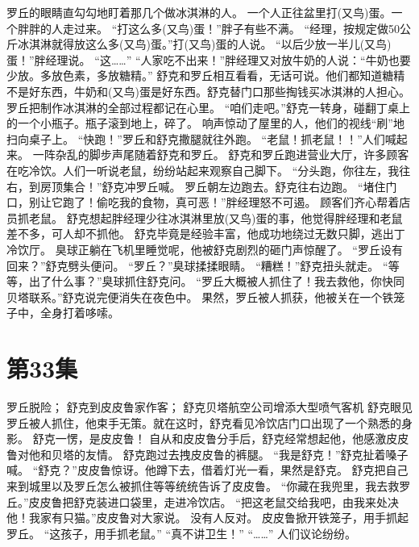 \documentclass[a4paper,12pt,UTF8,twoside]{ctexbook}
\begin{document}
        罗丘的眼睛直勾勾地盯着那几个做冰淇淋的人。 
        一个人正往盆里打(又鸟)蛋。一个胖胖的人走过来。 
        “打这么多(又鸟)蛋！”胖子有些不满。 
        “经理，按规定做50公斤冰淇淋就得放这么多(又鸟)蛋。”打(又鸟)蛋的人说。 
        “以后少放一半儿(又鸟)蛋！”胖经理说。 
        “这……” 
        “人家吃不出来！”胖经理又对放牛奶的人说：“牛奶也要少放。多放色素，多放糖精。” 
        舒克和罗丘相互看看，无话可说。他们都知道糖精不是好东西，牛奶和(又鸟)蛋是好东西。舒克替门口那些掏钱买冰淇淋的人担心。 
        罗丘把制作冰淇淋的全部过程都记在心里。 
        “咱们走吧。”舒克一转身，碰翻丁桌上的一个小瓶子。瓶子滚到地上，碎了。 
        响声惊动了屋里的人，他们的视线“刷”地扫向桌子上。 
        “快跑！”罗丘和舒克撒腿就往外跑。 
        “老鼠！抓老鼠！！”人们喊起来。 
        一阵杂乱的脚步声尾随着舒克和罗丘。 
        舒克和罗丘跑进营业大厅，许多顾客在吃冷饮。人们一听说老鼠，纷纷站起来观察自己脚下。 
        “分头跑，你往左，我往右，到房顶集合！”舒克冲罗丘喊。 
        罗丘朝左边跑去。舒克往右边跑。 
        “堵住门口，别让它跑了！偷吃我的食物，真可恶！”胖经理怒不可遏。 
        顾客们齐心帮着店员抓老鼠。 
        舒克想起胖经理少往冰淇淋里放(又鸟)蛋的事，他觉得胖经理和老鼠差不多，可人却不抓他。 
        舒克毕竟是经验丰富，他成功地绕过无数只脚，逃出丁冷饮厅。 
        臭球正躺在飞机里睡觉呢，他被舒克剧烈的砸门声惊醒了。 
        “罗丘设有回来？”舒克劈头便问。 
        “罗丘？”臭球揉揉眼睛。 
        “糟糕！”舒克扭头就走。 
        “等等，出了什么事？”臭球抓住舒克问。 
        “罗丘大概被人抓住了！我去救他，你快同贝塔联系。”舒克说完便消失在夜色中。 
        果然，罗丘被人抓获，他被关在一个铁笼子中，全身打着哆嗦。   \chapter{第33集} 
        罗丘脱险； 
        舒克到皮皮鲁家作客； 
        舒克贝塔航空公司增添大型喷气客机   
        舒克眼见罗丘被人抓住，他束手无策。就在这时，舒克看见冷饮店门口出现了一个熟悉的身影。 
        舒克一愣，是皮皮鲁！ 
        自从和皮皮鲁分手后，舒克经常想起他，他感激皮皮鲁对他和贝塔的友情。 
        舒克跑过去拽皮皮鲁的裤腿。 
        “我是舒克！”舒克扯着嗓子喊。 
        “舒克？”皮皮鲁惊讶。他蹲下去，借着灯光一看，果然是舒克。 
        舒克把自己来到城里以及罗丘怎么被抓住等等统统告诉了皮皮鲁。 
        “你藏在我兜里，我去救罗丘。”皮皮鲁把舒克装进口袋里，走进冷饮店。 
        “把这老鼠交给我吧，由我来处决他！我家有只猫。”皮皮鲁对大家说。 
        没有人反对。 
        皮皮鲁掀开铁笼子，用手抓起罗丘。 
        “这孩子，用手抓老鼠。” 
        “真不讲卫生！” 
        “……” 
        人们议论纷纷。 
\end{document}
